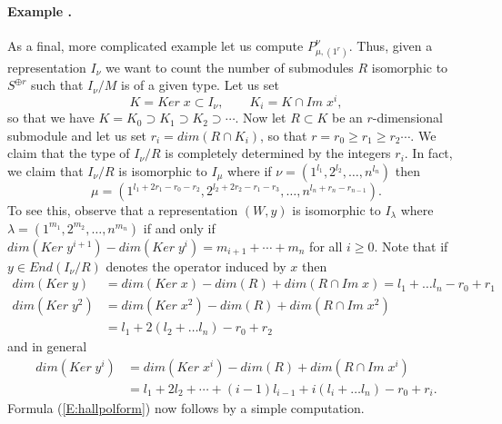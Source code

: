 \documentclass[a4paper,10pt]{amsart}
\numberwithin{equation}{section}
\begin{document}
\paragraph{\textbf{Example \thetheo.}}  As a final, more complicated example let us compute
$P^{\nu}_{\mu,(1^r)}$. Thus, given a representation $I_{\nu}$ we want to count the number of submodules $R$ isomorphic to $S^{\oplus r}$ such that $I_{\nu}/M$ is of a given type. Let us set
$$K={Ker}\;x \subset I_{\nu}, \qquad K_i=K \cap {Im}\;x^i,$$
so that we have $K=K_0 \supset K_1 \supset K_2 \supset \cdots$. Now let $R \subset K$ be an $r$-dimensional submodule and let us set $r_i={dim}(R \cap K_i)$, so that $r=r_0 \geq r_1 \geq r_2 \cdots$.  We claim that the type of $I_{\nu}/R$ is completely determined by the integers $r_i$. In fact, we claim that $I_{\nu}/R$ is isomorphic to $I_{\mu}$ where if $\nu=(1^{l_1}, 2^{l_2}, \ldots, n^{l_n})$ then
\begin{equation}\label{E:hallpolform}
\mu=(1^{l_1+2r_1-r_0-r_2}, 2^{l_2+2r_2-r_1-r_3}, \ldots, n^{l_n+r_n-r_{n-1}}).
\end{equation}
To see this, observe that a representation $(W,y)$ is isomorphic to $I_{\lambda}$ where $\lambda=(1^{m_1}, 2^{m_2}, \ldots,n^{m_n} )$ if and only if ${dim}({Ker}\;y^{i+1})-{dim}({Ker}\;y^i)=m_{i+1} + \cdots + m_n$ for all $i \geq 0$. Note that if $y \in {End}(I_{\nu}/R)$ denotes the operator induced by $x$ then
\begin{align*}
{dim}({Ker}\; y)&={dim}({Ker}\;x)-{dim}(R)+{dim}(R \cap {Im}\;x)=l_1+\ldots l_n -r_0+r_1\\
{dim}({Ker}\; y^2)&={dim}({Ker}\;x^2)-{dim}(R)+{dim}(R \cap {Im}\;x^2)\\
&=l_1+2(l_2+\ldots l_n) -r_0+r_2
\end{align*}
and in general
\begin{equation*}
\begin{split}
{dim}({Ker}\; y^i)&={dim}({Ker}\;x^i)-{dim}(R)+{dim}(R \cap {Im}\;x^i)\\
&=l_1+2l_2 + \cdots + (i-1)l_{i-1} + i(l_i+\ldots l_n) -r_0+r_i.
\end{split}
\end{equation*}
Formula (\ref{E:hallpolform}) now follows by a simple computation.
\end{document}
